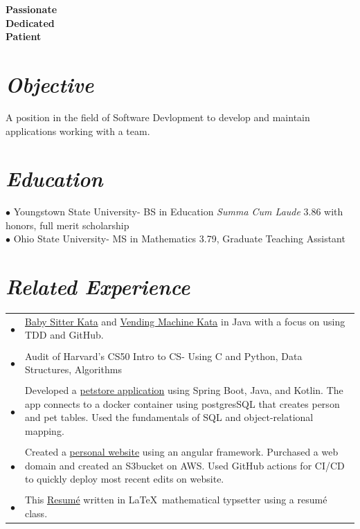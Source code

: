 \documentclass{res}
\begin{document}
\begin{resume}

\vspace{-3.5cm}
\begin{center}\hspace{-3cm}\bf \large Passionate\\ \hspace{-3cm}Dedicated\\\hspace{-3cm}Patient\end{center}
\vspace{1cm}

\section{\sl  \bf Objective}  %
A  position  in the field of Software Devlopment to develop and maintain applications working with a team. 
 
\section{\sl  \bf Education}
\indent $\bullet$ Youngstown State University- BS in Education \emph{Summa Cum Laude} 3.86 with honors, full merit scholarship \\
\indent $\bullet$ Ohio State University- MS in Mathematics 3.79, Graduate Teaching Assistant
 
\section{\sl \bf Related Experience}
\hspace{-0.18cm}\begin{tabular}{p{0\linewidth}p{\linewidth}}
$\bullet$ & \href{https://github.com/smudgegame/Baby-Sitter-Kata}{Baby Sitter Kata} and \href{https://github.com/smudgegame/Better-Vending-Machine}{Vending Machine Kata} in Java with a focus on using TDD and GitHub. \\
&\\
$\bullet$ & Audit of Harvard's CS50 Intro to CS-  Using C and Python, Data Structures, Algorithms\\
&\\
$\bullet$ & Developed a \href{https://github.com/smudgegame/petstore}{petstore application} using Spring Boot, Java, and Kotlin. The app connects to a docker container using postgresSQL that creates person and pet tables. Used the fundamentals of SQL and object-relational mapping. \\
&\\
$\bullet$ & Created a \href{aaronmargraff.com}{personal website} using an angular framework. Purchased a web domain and created an S3bucket on AWS. Used GitHub actions for CI/CD to quickly deploy most recent edits on website.\\
&\\
\indent $\bullet$ & This \href{https://github.com/smudgegame/amresume}{Resum\'e} written in \LaTeX \, mathematical typsetter using a resum\'e class. 
\end{tabular}



\end{resume}
\end{document}
